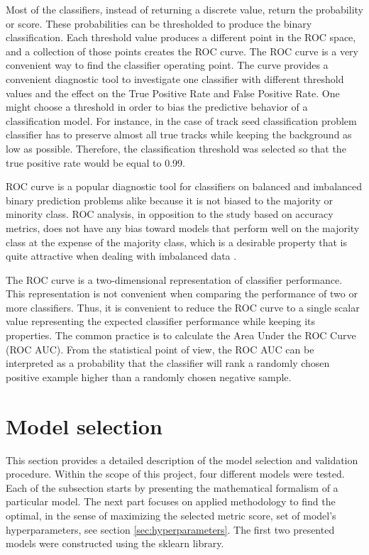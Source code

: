 Most of the classifiers, instead of returning a discrete value, return the probability or score. These probabilities can be thresholded to produce the binary classification.  Each threshold value produces a different point in the ROC space, and a collection of those points creates the ROC curve. The ROC curve is a very convenient way to find the classifier operating point. 
The curve provides a convenient diagnostic tool to investigate one classifier with different threshold values and the effect on the True Positive Rate and False Positive Rate. One might choose a threshold in order to bias the predictive behavior of a classification model. For instance, in the case of track seed classification problem classifier has to preserve almost all true tracks while keeping the background as low as possible. Therefore, the classification threshold was selected so that the true positive rate would be equal to 0.99.  

ROC curve is a popular diagnostic tool for classifiers on balanced and imbalanced binary prediction problems alike because it is not biased to the majority or minority class. ROC analysis, in opposition to the study based on accuracy metrics, does not have any bias toward models that perform well on the majority class at the expense of the majority class, which is a desirable property that is quite attractive when dealing with imbalanced data \cite{imbalanced_learnig}.

The ROC curve is a two-dimensional representation of classifier performance. This representation is not convenient when comparing the performance of two or more classifiers.  
 Thus, it is convenient to reduce the ROC curve to a single scalar value representing the expected classifier performance while keeping its properties. The common practice is to calculate the Area Under the ROC Curve (ROC AUC).  From the statistical point of view, the ROC AUC can be interpreted as a probability that the classifier will rank a randomly chosen positive example higher than a randomly chosen negative sample. 

\section{Model selection}

This section provides a detailed description of the model selection and validation procedure. Within the scope of this project, four different models were tested. Each of the subsection starts by presenting the mathematical formalism of a particular model. The next part focuses on applied methodology to find the optimal, in the sense of maximizing the selected metric score, set of model's hyperparameters, see section \ref{sec:hyperparameters}. 
The first two presented models were constructed using the sklearn library. 

